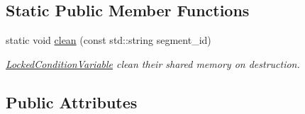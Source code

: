 \subsection*{Static Public Member Functions}
\begin{DoxyCompactItemize}
\item 
static void \hyperlink{classshared__memory_1_1LockedConditionVariable_aa3bca5020f84c8e0a90a2dad3e6521e5}{clean} (const std\+::string segment\+\_\+id)
\begin{DoxyCompactList}\small\item\em \hyperlink{classshared__memory_1_1LockedConditionVariable}{Locked\+Condition\+Variable} clean their shared memory on destruction. \end{DoxyCompactList}\end{DoxyCompactItemize}
\subsection*{Public Attributes}
